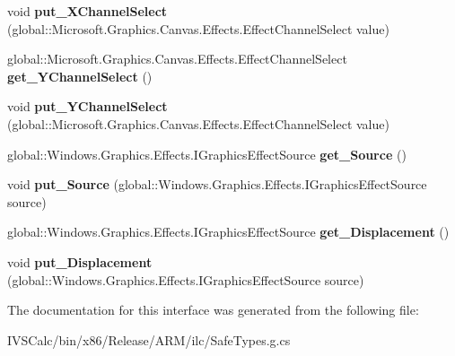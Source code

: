\begin{DoxyCompactItemize}
void {\bfseries put\+\_\+\+X\+Channel\+Select} (global\+::\+Microsoft.\+Graphics.\+Canvas.\+Effects.\+Effect\+Channel\+Select value)
\item 
\mbox{\label{interface_microsoft_1_1_graphics_1_1_canvas_1_1_effects_1_1_i_displacement_map_effect_afdb278b27ceb0bcc8d4f160ecadfb370}} 
global\+::\+Microsoft.\+Graphics.\+Canvas.\+Effects.\+Effect\+Channel\+Select {\bfseries get\+\_\+\+Y\+Channel\+Select} ()
\item 
\mbox{\label{interface_microsoft_1_1_graphics_1_1_canvas_1_1_effects_1_1_i_displacement_map_effect_a21fd084ca58eb6bb042e123fb75cf549}} 
void {\bfseries put\+\_\+\+Y\+Channel\+Select} (global\+::\+Microsoft.\+Graphics.\+Canvas.\+Effects.\+Effect\+Channel\+Select value)
\item 
\mbox{\label{interface_microsoft_1_1_graphics_1_1_canvas_1_1_effects_1_1_i_displacement_map_effect_a3ae94b5f7ba6e9a6577d1f8e64818dde}} 
global\+::\+Windows.\+Graphics.\+Effects.\+I\+Graphics\+Effect\+Source {\bfseries get\+\_\+\+Source} ()
\item 
\mbox{\label{interface_microsoft_1_1_graphics_1_1_canvas_1_1_effects_1_1_i_displacement_map_effect_a7510937c3744875c4cbbb6cb41254bd2}} 
void {\bfseries put\+\_\+\+Source} (global\+::\+Windows.\+Graphics.\+Effects.\+I\+Graphics\+Effect\+Source source)
\item 
\mbox{\label{interface_microsoft_1_1_graphics_1_1_canvas_1_1_effects_1_1_i_displacement_map_effect_ac59cc7dd5374f30d71b753983dba806d}} 
global\+::\+Windows.\+Graphics.\+Effects.\+I\+Graphics\+Effect\+Source {\bfseries get\+\_\+\+Displacement} ()
\item 
\mbox{\label{interface_microsoft_1_1_graphics_1_1_canvas_1_1_effects_1_1_i_displacement_map_effect_a2d5970972f40598f146c9ef349c15471}} 
void {\bfseries put\+\_\+\+Displacement} (global\+::\+Windows.\+Graphics.\+Effects.\+I\+Graphics\+Effect\+Source source)
\end{DoxyCompactItemize}


The documentation for this interface was generated from the following file\+:\begin{DoxyCompactItemize}
\item 
I\+V\+S\+Calc/bin/x86/\+Release/\+A\+R\+M/ilc/Safe\+Types.\+g.\+cs\end{DoxyCompactItemize}

